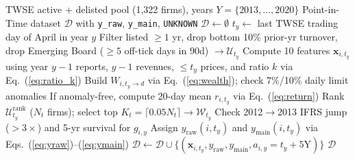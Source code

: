 \documentclass[conference]{IEEEtran}
\begin{document}
\begin{algorithm}[t]
\caption{Point-in-Time Dataset \& Dual-Label Builder}
\label{alg:dataset}
\scriptsize
\begin{algorithmic}[1]
\Require TWSE active + delisted pool (1,322 firms), years $Y{=}\{2013,\dots,2020\}$
\Ensure Point-in-Time dataset $\mathcal{D}$ with \texttt{y\_raw}, \texttt{y\_main}, \texttt{UNKNOWN}
\State $\mathcal{D} \gets \emptyset$
    \State $t_y \gets$ last TWSE trading day of April in year $y$
    \State Filter listed $\ge 1$ yr, drop bottom 10\% prior-yr turnover, drop Emerging Board ($\ge 5$ off-tick days in 90d) $\rightarrow \mathcal{U}_{t_y}$
        \State Compute 10 features $\mathbf{x}_{i,t_y}$ using year $y{-}1$ reports, $y{-}1$ revenues, $\le t_y$ prices, and ratio $k$ via Eq.~(\ref{eq:ratio_k})
        \State Build $W_{i,t_y \to d}$ via Eq.~(\ref{eq:wealth}); check 7\%/10\% daily limit anomalies
        \State If anomaly-free, compute 20-day mean $r_{i,t_y}$ via Eq.~(\ref{eq:return})
    \EndFor
    \State Rank $\mathcal{U}_{t_y}^{\text{rank}}$ ($N_t$ firms); select top $K_t = \lceil 0.05 N_t \rceil \rightarrow \mathcal{W}_{t_y}$
        \State Check 2012$\to$2013 IFRS jump ($>3\times$) and 5-yr survival for $g_{i,y}$
        \State Assign $y_{\text{raw}}(i,t_y)$ and $y_{\text{main}}(i,t_y)$ via Eqs.~(\ref{eq:yraw})--(\ref{eq:ymain})
        \State $\mathcal{D} \gets \mathcal{D} \cup \{(\mathbf{x}_{i,t_y}, y_{\text{raw}}, y_{\text{main}}, a_{i,y}{=}t_y{+}5\text{Y})\}$
    \EndFor
\EndFor
\State \Return $\mathcal{D}$
\end{algorithmic}
\end{algorithm}
\end{document}
